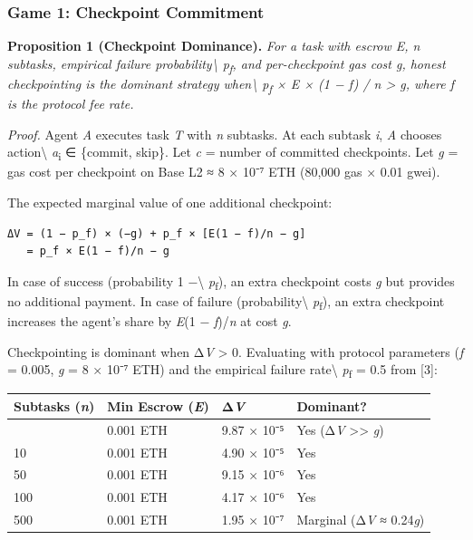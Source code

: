 \documentclass[
  10pt,
]{article}
\begin{document}
\hypertarget{game-1-checkpoint-commitment}{%
\subsubsection{Game 1: Checkpoint
Commitment}\label{game-1-checkpoint-commitment}}

\textbf{Proposition 1 (Checkpoint Dominance).} \emph{For a task with
escrow E, n subtasks, empirical failure probability\textbackslash{}
p\textsubscript{f}, and per-checkpoint gas cost g, honest checkpointing
is the dominant strategy when\textbackslash{} p\textsubscript{f} × E ×
(1 − f) / n \textgreater{} g, where f is the protocol fee rate.}

\emph{Proof.} Agent \emph{A} executes task \emph{T} with \emph{n}
subtasks. At each subtask \emph{i}, \emph{A} chooses
action\textbackslash{} \emph{a}\textsubscript{i} ∈ \{commit, skip\}. Let
\emph{c} = number of committed checkpoints. Let \emph{g} = gas cost per
checkpoint on Base L2 ≈ 8 × 10⁻⁷ ETH (80,000 gas × 0.01 gwei).

The expected marginal value of one additional checkpoint:

\begin{verbatim}
ΔV = (1 − p_f) × (−g) + p_f × [E(1 − f)/n − g]
   = p_f × E(1 − f)/n − g
\end{verbatim}

In case of success (probability 1 −\textbackslash{}
\emph{p}\textsubscript{f}), an extra checkpoint costs \emph{g} but
provides no additional payment. In case of failure
(probability\textbackslash{} \emph{p}\textsubscript{f}), an extra
checkpoint increases the agent's share by \emph{E}(1 −
\emph{f})/\emph{n} at cost \emph{g}.

Checkpointing is dominant when Δ\emph{V} \textgreater{} 0. Evaluating
with protocol parameters (\emph{f} = 0.005, \emph{g} = 8 × 10⁻⁷ ETH) and
the empirical failure rate\textbackslash{} \emph{p}\textsubscript{f} =
0.5 from {[}3{]}:

\begin{longtable}[]{@{}llll@{}}
\toprule\noalign{}
Subtasks (\emph{n}) & Min Escrow (\emph{E}) & Δ\emph{V} & Dominant? \\
\midrule\noalign{}
\endhead
\bottomrule\noalign{}
\endlastfoot
5 & 0.001 ETH & 9.87 × 10⁻⁵ & Yes (Δ\emph{V} \textgreater\textgreater{}
\emph{g}) \\
10 & 0.001 ETH & 4.90 × 10⁻⁵ & Yes \\
50 & 0.001 ETH & 9.15 × 10⁻⁶ & Yes \\
100 & 0.001 ETH & 4.17 × 10⁻⁶ & Yes \\
500 & 0.001 ETH & 1.95 × 10⁻⁷ & Marginal (Δ\emph{V} ≈ 0.24\emph{g}) \\
\end{longtable}
\end{document}
